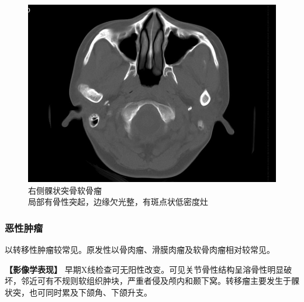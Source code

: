 \begin{figure}[!htbp]
 \centering
 \includegraphics[width=.7\textwidth,height=\textheight,keepaspectratio]{./images/Image00165.jpg}
 \captionsetup{justification=centering}
 \caption{右侧髁状突骨软骨瘤\\{\small 局部有骨性突起，边缘欠光整，有斑点状低密度灶}}
 \label{fig7-8}
  \end{figure} 

\subsubsection{恶性肿瘤}

以转移性肿瘤较常见。原发性以骨肉瘤、滑膜肉瘤及软骨肉瘤相对较常见。

\textbf{【影像学表现】}
早期X线检查可无阳性改变。可见关节骨性结构呈溶骨性明显破坏，邻近可有不规则软组织肿块，严重者侵及颅内和颞下窝。转移瘤主要发生于髁状突，也可同时累及下颌角、下颌升支。

\protect\hypertarget{text00015.html}{}{}

